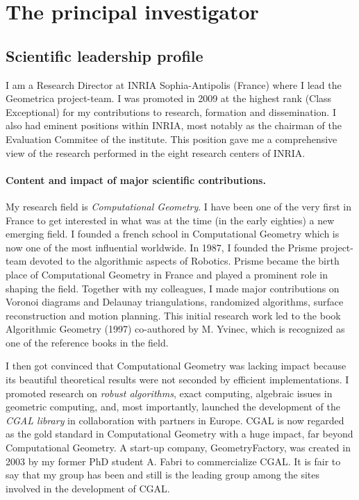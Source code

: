 \section{The principal investigator}


\subsection{Scientific leadership profile}

I am a Research Director at INRIA Sophia-Antipolis (France) where I lead the Geometrica project-team. I was promoted in 2009 at the highest rank (Class Exceptional) for my contributions to research, formation and dissemination. I also had eminent positions within INRIA, most notably  as the chairman of the Evaluation Commitee of the institute. This position gave me  a comprehensive view of the research performed in the eight research centers of INRIA.

\paragraph{Content and impact of major scientific contributions.}

My research field is {\em Computational Geometry}. I have been one of the very first in France to
get interested in what was at the time (in the early eighties) a new emerging field. I founded a french school in Computational Geometry which is now one of the most influential worldwide.
In 1987, I founded the Prisme project-team devoted to the algorithmic aspects of Robotics. Prisme became the birth place of Computational Geometry in France and played a prominent role in shaping the field. Together with my colleagues, I made major contributions on Voronoi diagrams and Delaunay triangulations, randomized algorithms, surface reconstruction and motion planning. This initial research work led to the book Algorithmic Geometry (1997) co-authored by M. Yvinec, which is recognized as one of the reference books in the field.

I then got convinced that Computational Geometry was lacking impact because its beautiful theoretical results were not seconded by efficient implementations. I promoted research on {\em robust algorithms}, exact computing, algebraic issues in geometric computing, and, most importantly, launched the development of the {\em CGAL library} in collaboration with partners in Europe. CGAL is now regarded as the gold standard in Computational Geometry with a huge impact, far beyond Computational Geometry. A start-up company, GeometryFactory, was created in 2003 by my former PhD student A. Fabri to commercialize CGAL. It is fair to say that my group has been and still  is the leading group among the sites involved in the development of CGAL.

